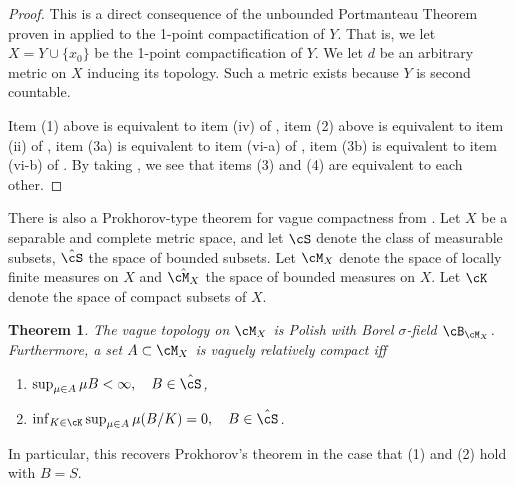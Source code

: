 \documentclass[12pt]{article}
\theoremstyle{plain}
\newtheorem{thm}{Theorem}[section]
\theoremstyle{definition}
\theoremstyle{remark}
\begin{document}
\begin{proof}
This is a direct consequence of the unbounded Portmanteau Theorem proven in \cite[Theorem 2.1]{MR2271177} applied to the 1-point compactification of $Y$. That is, we let $X=Y\cup \{x_0\}$ be the 1-point compactification of $Y$. We let $d$ be an arbitrary metric on $X$ inducing its topology. Such a metric exists because $Y$ is second countable. 



Item (1) above is equivalent to item (iv) of \cite[Theorem 2.1]{MR2271177}, item (2) above is equivalent to item (ii) of \cite[Theorem 2.1]{MR2271177}, item (3a) is equivalent to item (vi-a) of \cite[Theorem 2.1]{MR2271177}, item (3b) is equivalent to item (vi-b) of \cite[Theorem 2.1]{MR2271177}. By taking , we see that items (3) and (4) are equivalent to each other.
\end{proof}

There is also a Prokhorov-type theorem for vague compactness from \cite{MR3642325}. Let $X$ be a separable and complete metric space, and let $\cS$ denote the class of measurable subsets, $\hat\cS$ the space of bounded subsets.
Let $\cM_X$ denote the space of locally finite measures on $X$ and $\hat{\cM_X}$ the space of bounded measures on $X$. Let $\cK$ denote the space of compact subsets of $X$. 
\begin{thm}
    The vague topology on $\cM_X$ is Polish with Borel $\sigma$-field $\cB_{\cM_X}$. Furthermore, a set $A \subset \cM_X$ is vaguely relatively compact iff \begin{enumerate}
        \item $\sup_{\mu\in A} \mu B < \infty, \quad B \in \hat\cS$,
        \item $\inf_{K\in\cK} \sup_{\mu \in A} \mu(B/K) = 0, \quad B \in \hat\cS$.
    \end{enumerate}
\end{thm}
\noindent In particular, this recovers Prokhorov's theorem in the case that (1) and (2) hold with $B = S$. 










\end{document}

